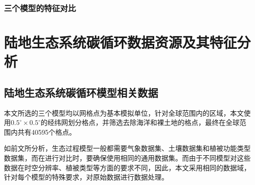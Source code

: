 \subsubsection{三个模型的特征对比}

\section{陆地生态系统碳循环数据资源及其特征分析}
\subsection{陆地生态系统碳循环模型相关数据}
本文所选的三个模型均以网格点为基本模拟单位，针对全球范围内的区域，本文使用$0.5^{\circ} \times 0.5^{\circ}$的经纬网划分格点，并筛选去除海洋和裸土地的格点，最终在全球范围内共有40595个格点。

如前文所分析，生态过程模型一般都需要气象数据集、土壤数据集和植被功能类型数据集，而在进行对比时，要确保使用相同的通用数据集。而由于不同模型对这些数据在时空分辨率、植被类型等方面的要求不同，因此，本文采用相同的数据域，针对每个模型的特殊要求，对原始数据进行数据处理。


